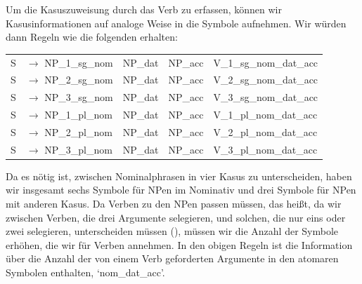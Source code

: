 Um die Kasuszuweisung durch das Verb zu erfassen, können wir Kasusinformationen auf analoge Weise in die Symbole aufnehmen. Wir würden dann
Regeln wie die folgenden erhalten:
\ea
\label{ditrans-ps-regeln}
\begin{tabular}[t]{@{}l@{ }l@{~~}l@{~~}l@{~~}l}
S  & $\to$ NP\_1\_sg\_nom & NP\_dat & NP\_acc & V\_1\_sg\_nom\_dat\_acc\\
S  & $\to$ NP\_2\_sg\_nom & NP\_dat & NP\_acc & V\_2\_sg\_nom\_dat\_acc\\
S  & $\to$ NP\_3\_sg\_nom & NP\_dat & NP\_acc & V\_3\_sg\_nom\_dat\_acc\\
S  & $\to$ NP\_1\_pl\_nom & NP\_dat & NP\_acc & V\_1\_pl\_nom\_dat\_acc\\
S  & $\to$ NP\_2\_pl\_nom & NP\_dat & NP\_acc & V\_2\_pl\_nom\_dat\_acc\\
S  & $\to$ NP\_3\_pl\_nom & NP\_dat & NP\_acc & V\_3\_pl\_nom\_dat\_acc\\
\end{tabular}
\z
Da es nötig ist, zwischen Nominalphrasen in vier Kasus zu unterscheiden, haben wir insgesamt sechs Symbole für NPen im Nominativ und drei Symbole für NPen mit
anderen Kasus. Da Verben zu den NPen passen müssen, das heißt, da wir zwischen Verben, die drei Argumente selegieren, und solchen, die nur eins oder zwei selegieren, unterscheiden müssen (),
müssen wir die Anzahl der Symbole erhöhen, die wir für Verben annehmen.
\eal
{}
\zl
In den obigen Regeln ist die Information über die Anzahl der von einem Verb geforderten Argumente in
den atomaren Symbolen enthalten, \zb `nom\_dat\_acc'.

